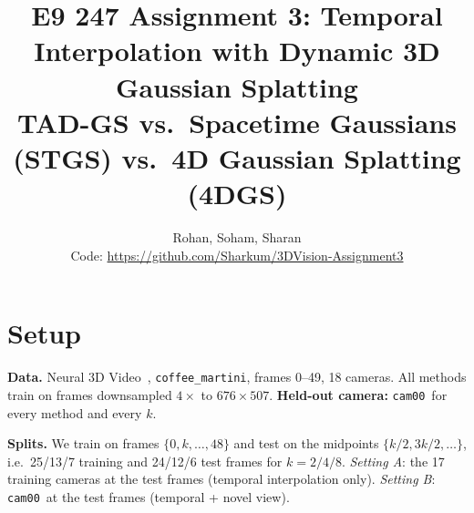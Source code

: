 \documentclass[10pt,a4paper]{article}
\title{E9 247 Assignment 3: Temporal Interpolation with Dynamic 3D Gaussian Splatting\\[2pt]
\large TAD-GS vs.\ Spacetime Gaussians (STGS) vs.\ 4D Gaussian Splatting (4DGS)}
\author{Rohan, Soham, Sharan\\[2pt]
\small Code: \url{https://github.com/Sharkum/3DVision-Assignment3}}
\date{}
\newcommand{\camz}{\texttt{cam00}}
\begin{document}
\maketitle

\section{Setup}
\textbf{Data.} Neural 3D Video~\cite{dynerf}, \texttt{coffee\_martini}, frames 0--49, 18 cameras. All methods train on frames downsampled $4\times$ to $676\times507$. \textbf{Held-out camera:} \camz\ for every method and every $k$.

\textbf{Splits.} We train on frames $\{0,k,\ldots,48\}$ and test on the midpoints $\{k/2,3k/2,\ldots\}$, i.e.\ 25/13/7 training and 24/12/6 test frames for $k=2/4/8$. \emph{Setting A}: the 17 training cameras at the test frames (temporal interpolation only). \emph{Setting B}: \camz\ at the test frames (temporal + novel view).
\end{document}
